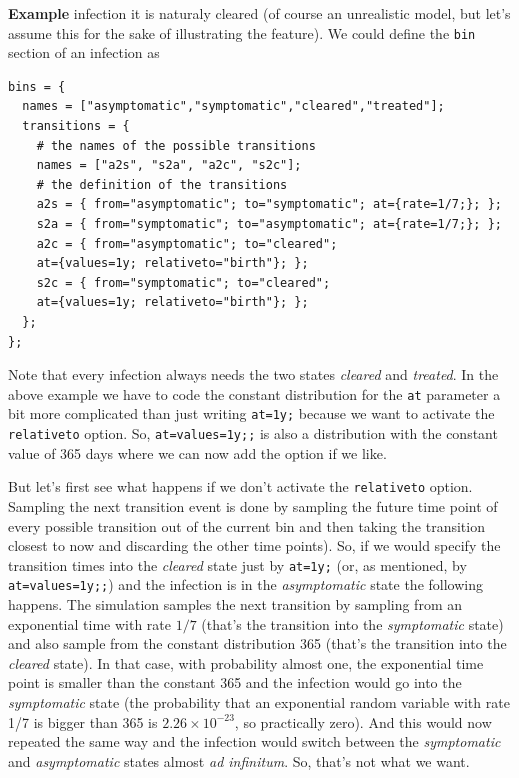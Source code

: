 \documentclass[11pt]{article}
\newenvironment{example}{\par\smallskip\noindent\begingroup\small\textbf{\small Example\enskip}}{\endgroup\par\smallskip}
\begin{document}
\begin{itemize}
\begin{example}
infection it is naturaly cleared (of course an unrealistic model, but let's
assume this for the sake of illustrating the feature). We could define the
\texttt{bin} section of an infection as
\begin{verbatim}
bins = {
  names = ["asymptomatic","symptomatic","cleared","treated"];
  transitions = {
    # the names of the possible transitions
    names = ["a2s", "s2a", "a2c", "s2c"];
    # the definition of the transitions
    a2s = { from="asymptomatic"; to="symptomatic"; at={rate=1/7;}; };
    s2a = { from="symptomatic"; to="asymptomatic"; at={rate=1/7;}; };
    a2c = { from="asymptomatic"; to="cleared"; 
    at={values=1y; relativeto="birth"}; }; 
    s2c = { from="symptomatic"; to="cleared"; 
    at={values=1y; relativeto="birth"}; }; 
  };
};
\end{verbatim}
Note that every infection always needs the two states \emph{cleared}
and \emph{treated}. In the above example we have to code the constant
distribution for the \texttt{at} parameter a bit more complicated than just
writing \texttt{at=1y;} because we want to activate the \texttt{relativeto}
option. So, \texttt{at=values=1y;;} is also a
distribution with the constant value of 365 days where we can now add the
option if we like.

But let's first see what happens if we don't activate the \texttt{relativeto}
option. Sampling the next transition event is done by sampling the future time
point of every possible transition out of the current bin and then taking the
transition closest to now and discarding the other time points). So, if we would
specify the transition times into the \emph{cleared} state just by
\texttt{at=1y;} (or, as mentioned, by
\texttt{at=values=1y;;}) and the infection is in the
\emph{asymptomatic} state the following happens. The simulation
samples the next transition by sampling from an exponential time with rate $1/7$
(that's the transition into the \emph{symptomatic} state) and also sample from
the constant distribution 365 (that's the transition into the \emph{cleared}
state). In that case, with probability almost one, the exponential time point is
smaller than the constant 365 and the infection would go into the
\emph{symptomatic} state (the probability that an exponential random variable
with rate 1/7 is bigger than 365 is $2.26\times10^{-23}$, so practically zero).
And this would now repeated the same way and the infection would switch between
the \emph{symptomatic} and \emph{asymptomatic} states almost \emph{ad 
infinitum}. So, that's not what we want. 


\end{example}
\end{itemize}
\end{document}

